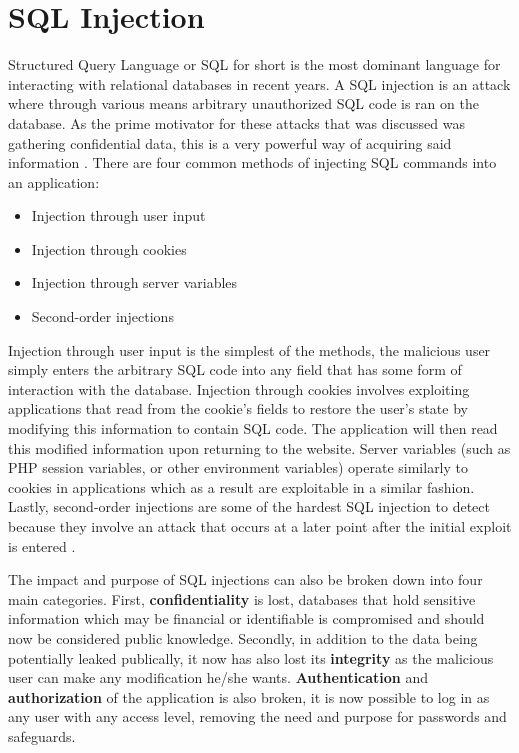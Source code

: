 \section{SQL Injection}\label{sec:sqliExplanation}
Structured Query Language or SQL for short is the most dominant language for interacting with relational databases in recent years.  A SQL injection is an attack where through various means arbitrary unauthorized SQL code is ran on the database.  As the prime motivator for these attacks that was discussed was gathering confidential data, this is a very powerful way of acquiring said information \cite{aSurveyOnWeb}.  There are four common methods of injecting SQL commands into an application:

\begin{itemize}
	\item Injection through user input
	\item Injection through cookies
	\item Injection through server variables
	\item Second-order injections
\end{itemize}

Injection through user input is the simplest of the methods, the malicious user simply enters the arbitrary SQL code into any field that has some form of interaction with the database.  Injection through cookies involves exploiting applications that read from the cookie's fields to restore the user's state by modifying this information to contain SQL code.   The application will then read this modified information upon returning to the website.  Server variables (such as PHP session variables, or other environment variables) operate similarly to cookies in applications which as a result are exploitable in a similar fashion.    Lastly, second-order injections are some of the hardest SQL injection to detect because they involve an attack that occurs at a later point after the initial exploit is entered \cite{aClassificationOfSQL}.

The impact and purpose of SQL injections can also be broken down into four main categories.  First, \textbf{confidentiality} is lost, databases that hold sensitive information which may be financial or identifiable is compromised and should now be considered public knowledge.  Secondly, in addition to the data being potentially leaked publically, it now has also lost its \textbf{integrity} as the malicious user can make any modification he/she wants.  \textbf{Authentication} and \textbf{authorization} of the application is also broken, it is now possible to log in as any user with any access level, removing the need and purpose for passwords and safeguards.


